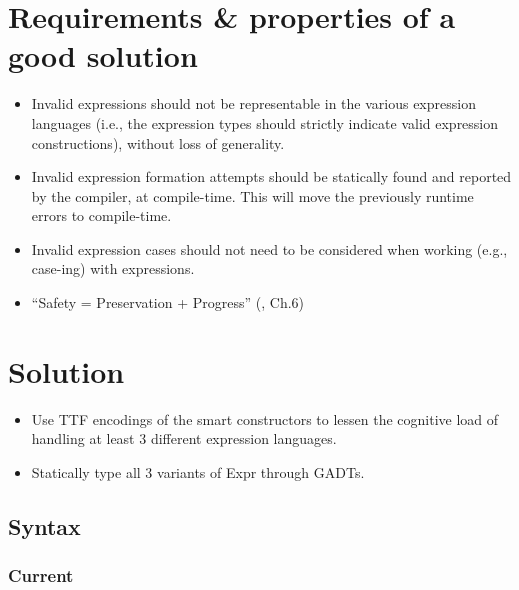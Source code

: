 \section{Requirements \& properties of a good solution}

\begin{itemize}

      \item Invalid expressions should not be representable in the various
            expression languages (i.e., the expression types should strictly
            indicate valid expression constructions), without loss of
            generality.

      \item Invalid expression formation attempts should be statically found and
            reported by the compiler, at compile-time. This will move the
            previously runtime errors to compile-time.

      \item Invalid expression cases should not need to be considered when
            working (e.g., case-ing) with expressions.

      \item ``Safety = Preservation + Progress'' (\cite{Harper2016}, Ch.6)

\end{itemize}

\section{Solution}

\begin{itemize}

      \item Use TTF encodings of the smart constructors to lessen the cognitive
            load of handling at least 3 different expression languages.

      \item Statically type all 3 variants of Expr through GADTs.

\end{itemize}

\subsection{Syntax}

\subsubsection{Current}


